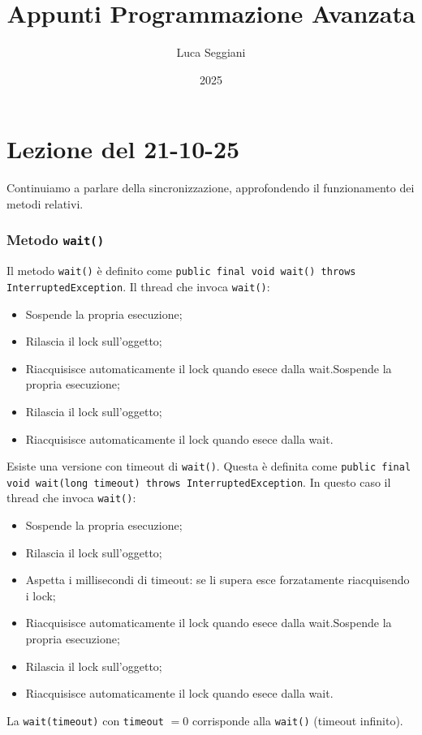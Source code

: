 \documentclass[a4paper,11pt]{article}
\title{Appunti Programmazione Avanzata}
\author{Luca Seggiani}
\date{2025}
\begin{document}
\section{Lezione del 21-10-25}

\thispagestyle{empty}
\pagestyle{fancy}

Continuiamo a parlare della sincronizzazione, approfondendo il funzionamento dei metodi relativi.

\subsubsection{Metodo \lstinline|wait()|}
Il metodo \lstinline|wait()| è definito come \lstinline|public final void wait() throws InterruptedException|.
Il thread che invoca \lstinline|wait()|:
\begin{itemize}
	\item Sospende la propria esecuzione;
	\item Rilascia il lock sull'oggetto;
	\item Riacquisisce automaticamente il lock quando esece dalla wait.Sospende la propria esecuzione;
	\item Rilascia il lock sull'oggetto;
	\item Riacquisisce automaticamente il lock quando esece dalla wait.
\end{itemize}

Esiste una versione con timeout di \lstinline|wait()|.
Questa è definita come \lstinline|public final void wait(long timeout) throws InterruptedException|.
In questo caso il thread che invoca \lstinline|wait()|:
\begin{itemize}
	\item Sospende la propria esecuzione;
	\item Rilascia il lock sull'oggetto;
	\item Aspetta i millisecondi di timeout: se li supera esce forzatamente riacquisendo i lock;
	\item Riacquisisce automaticamente il lock quando esece dalla wait.Sospende la propria esecuzione;
	\item Rilascia il lock sull'oggetto;
	\item Riacquisisce automaticamente il lock quando esece dalla wait.
\end{itemize}

La \lstinline|wait(timeout)| con \lstinline|timeout| $= 0$ corrisponde alla \lstinline|wait()| (timeout infinito).
\end{document}
